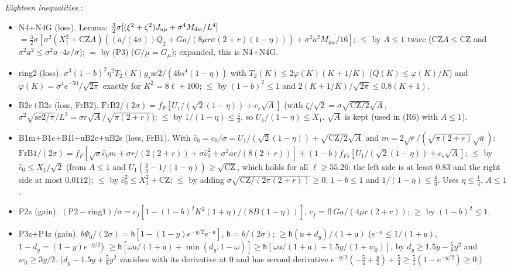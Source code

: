 \emph{Eighteen inequalities} \proofst:
\begin{itemize}
\item N4$+$N4G (loss). Lemma: $\frac32\sigma[(\xi^2+\zeta^2)J_{\rm up}+\sigma^4M_{4w}/L^4]$ $=\frac32\sigma[\sigma^2(X_1^2+\mathrm{CZ}A)((a/(4\sigma))Q_2+Ga/(8\mu r\sigma(2+r)(1-\eta)))+\sigma^2a^2M_{4w}/16]$; $\le$ by $A\le1$ twice ($\mathrm{CZ}A\le\mathrm{CZ}$ and $\sigma^2a^2\le\sigma^2a\cdot4r/\sigma$); $=$ by (P3) ($G/\mu=G_\mu$); expanded, this is N4$+$N4G.
\item ring2 (loss). $\sigma^3(1-b)^2\eta^2T_2(K)g_s\mathrm{se2}/(4bs^4(1-\eta))$ with $T_2(K)\le2\varphi(K)(K+1/K)$ ($Q(K)\le\varphi(K)/K$) and $\varphi(K)=\sigma^4e^{-50}/\sqrt{2\pi}$ exactly for $K^2=8\ell+100$; $\le$ by $(1-b)^2\le1$ and $2(K+1/K)/\sqrt{2\pi}\le0.8(K+1)$.
\item B2c$+$B2s (loss, FrB2). $\mathrm{FrB2}/(2\sigma)=f_F[U_1/(\sqrt2(1-\eta))+c_s\sqrt A]$ (with $\zeta/\sqrt2=\sigma\sqrt{\mathrm{CZ}/2}\sqrt A$, $\sigma^2\sqrt{\mathrm{se2}/\pi}/L^2=\sigma r\sqrt A/\sqrt{\pi(2+r)}$); $\le$ by $1/(1-\eta)\le\frac43$, so $U_1/(1-\eta)\le X_1$. $\sqrt A$ is kept (used in (R6) with $A\le1$).
\item B1m$+$B1c$+$B1l$+$uB2c$+$uB2s (loss, FrB1). With $\hat c_0=c_0/\sigma=U_1/(\sqrt2(1-\eta))+\sqrt{\mathrm{CZ}/2}\sqrt A$ and $m=2\sqrt r/(\sqrt{\pi(2+r)}\sqrt a)$: $\mathrm{FrB1}/(2\sigma)=f_F[\sqrt\sigma\hat c_0m+\sigma r/(2(2+r))+\sigma\hat c_0^2+\sigma^2ar/(8(2+r))]+(1-b)f_{Fs}[U_1/(\sqrt2(1-\eta))+c_s\sqrt A]$;
$\le$ by $\hat c_0\le X_1/\sqrt2$ (from $A\le1$ and $U_1(\frac43-1/(1-\eta))\ge\sqrt{\mathrm{CZ}}$, which holds for all $\ell\ge55.26$: the left side is at least $0.83$ and the right side at most $0.0112$); $\le$ by $\hat c_0^2\le X_1^2+\mathrm{CZ}$; $\le$ by adding $\sigma\sqrt{\mathrm{CZ}/(2\pi(2+r))}\ge0$, $1-b\le1$ and $1/(1-\eta)\le\frac43$. Uses $\eta\le\frac14$, $A\le1$.
\item P2z (gain). $(\mathrm{P2}-\mathrm{ring1})/\sigma=c_f[1-(1-b)^2K^2(1+\eta)/(8B(1-\eta))]$, $c_f=\mathrm{fl}\,Ga/(4\mu r(2+r))$; $\ge$ by $(1-b)^2\le1$.
\item P3z$+$P4z (gain). $b\Psi_0/(2\sigma)=\mathsf h[1-(1-y)e^{-y/2}e^{-\mathsf u}]$, $\mathsf h=b/(2\sigma)$; $\ge\mathsf h(\mathsf u+d_y)/(1+\mathsf u)$ ($e^{-\mathsf u}\le1/(1+\mathsf u)$, $1-d_y=(1-y)e^{-y/2}$) $\ge\mathsf h[\omega\mathsf u/(1+\mathsf u)+\min(d_y,1-\omega)]\ge\mathsf h[\omega\mathsf u/(1+\mathsf u)+1.5y/(1+w_0)]$, by $d_y\ge1.5y-\frac58y^2$ and $w_0\ge3y/2$. ($d_y-1.5y+\frac58y^2$ vanishes with its derivative at $0$ and has second derivative $e^{-y/2}(-\frac54+\frac y4)+\frac54\ge\frac54(1-e^{-y/2})\ge0$.)

\end{itemize}

